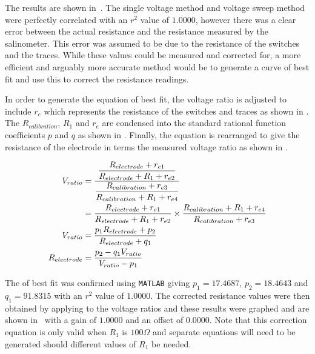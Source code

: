 The results are shown in~. 
The single voltage method and voltage sweep method were perfectly correlated with an $r^2$ value of $1.0000$, however there was a clear error between the actual resistance and the resistance measured by the salinometer.
This error was assumed to be due to the resistance of the switches and the traces.
While these values could be measured and corrected for, a more efficient and arguably more accurate method would be to generate a curve of best fit and use this to correct the resistance readings.

In order to generate the equation of best fit, the voltage ratio  is adjusted to include $r_e$ which represents the resistance of the switches and traces as shown in .
The $R_{calibration}$, $R_1$ and $r_e$ are condensed into the standard rational function coefficients $p$ and $q$ as shown in .
Finally, the equation is rearranged to give the resistance of the electrode in terms the measured voltage ratio as shown in .

\begin{align}
    V_{ratio} &= \frac{\displaystyle \frac{\displaystyle R_{electrode} + r_{e1}}{\displaystyle R_{electrode} + R_1 + r_{e2}}}{\displaystyle \frac{\displaystyle R_{calibration} + r_{e3}}{\displaystyle R_{calibration} + R_1 + r_{e4}}} \nonumber \\
    &= \frac{\displaystyle R_{electrode} + r_{e1}}{\displaystyle R_{electrode} + R_1 + r_{e2}} \times \frac{\displaystyle R_{calibration} + R_1 + r_{e4}}{\displaystyle R_{calibration} + r_{e3}} \label{eqn:resistance-measuring} \\
    V_{ratio} &= \frac{\displaystyle p_1 R_{electrode} + p_2}{\displaystyle R_{electrode} + q_1} \label{eqn:resistance-measuring-rational} \\
    R_{electrode} &= \frac{\displaystyle p_2 - q_1 V_{ratio}}{\displaystyle V_{ratio} - p_1} \label{eqn:resistance-measuring-rearranged}
\end{align}

The  of best fit was confirmed using \texttt{MATLAB} giving $p_1 = 17.4687$, $p_2 = 18.4643$ and $q_1 = 91.8315$ with an $r^2$ value of $1.0000$. 
The corrected resistance values were then obtained by applying  to the voltage ratios and these results were graphed and are shown in~ with a gain of $1.0000$ and an offset of $0.0000$.
Note that this correction equation is only valid when $R_1$ is $100\Omega$ and separate equations will need to be generated should different values of $R_1$ be needed.